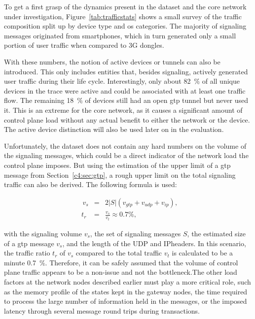 To get a first grasp of the dynamics present in the dataset and the core network under investigation, Figure~\ref{tab:trafficstats} shows a small survey of the traffic composition split up by device type and \gls{os} categories. The majority of signaling messages originated from smartphones, which in turn generated only a small portion of user traffic when compared to \gls{3G} dongles.

With these numbers, the notion of active devices or tunnels can also be introduced. This only includes entities that, besides signaling, actively generated user traffic during their life cycle. Interestingly, only about \SI{82}{\percent} of all unique devices in the trace were active and could be associated with at least one traffic flow. The remaining \SI{18}{\percent} of devices still had an open \gls{gtp} tunnel but never used it. This is an extreme for the core network, as it causes a significant amount of control plane load without any actual benefit to either the network or the device. The active device distinction will also be used later on in the evaluation.

Unfortunately, the dataset does not contain any hard numbers on the volume of the signaling messages, which could be a direct indicator of the network load the control plane imposes. But using the estimation of the upper limit of a \gls{gtp} message from Section~\ref{c4:sec:gtp}, a rough upper limit on the total signaling traffic can also be derived. The following formula is used:

\begin{align}
\phantom{,}v_s &=& 2\left|S\right|(v_{gtp} + v_{udp} + v_{ip})\text{,}\\
\phantom{.}t_r &=& \frac{v_s}{v_t} \approx 0.7\si{\percent}\text{,}
\end{align}

with the signaling volume $v_s$, the set of signaling messages $S$, the estimated size of a \gls{gtp} message $v_s$, and the length of the \gls{UDP} and \gls{IP}headers. In this scenario, the traffic ratio $t_r$ of $v_s$ compared to the total traffic $v_t$ is calculated to be a minute \SI{0.7}{\percent}. Therefore, it can be safely assumed that the volume of control plane traffic appears to be a non-issue and not the bottleneck.The other load factors at the network nodes described earlier must play a more critical role, such as the memory profile of the states kept in the gateway nodes, the time required to process the large number of information held in the messages, or the imposed latency through several message round trips during transactions.

